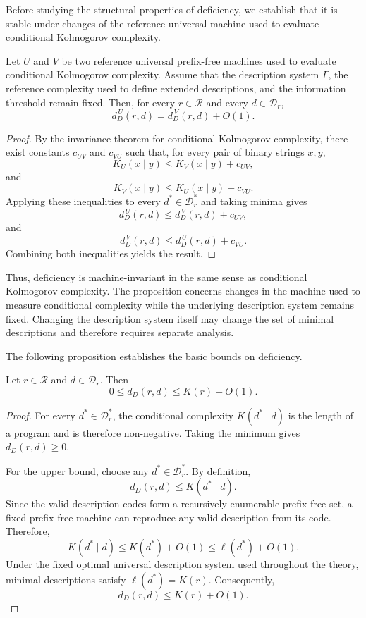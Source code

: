 Before studying the structural properties of deficiency, we establish that it is stable under changes of the reference universal machine used to evaluate conditional Kolmogorov complexity.

\begin{proposition}
\label{prop:deficiency_description_machine_invariance}
Let $U$ and $V$ be two reference universal prefix-free machines used to evaluate conditional Kolmogorov complexity. Assume that the description system $\Gamma$, the reference complexity used to define extended descriptions, and the information threshold remain fixed. Then, for every $r\in\mathcal R$ and every $d\in\mathcal D_r$,
\[
d_D^{\,U}(r,d) = d_D^{\,V}(r,d)+O(1).
\]
\end{proposition}
\begin{proof}
By the invariance theorem for conditional Kolmogorov complexity, there exist constants $c_{UV}$ and $c_{VU}$ such that, for every pair of binary strings $x,y$,
\[
K_U(x\mid y)\le K_V(x\mid y)+c_{UV},
\]
and
\[
K_V(x\mid y)\le K_U(x\mid y)+c_{VU}.
\]
Applying these inequalities to every $d^\ast\in\mathcal D_r^\ast$ and taking minima gives
\[
d_D^{\,U}(r,d)\le d_D^{\,V}(r,d)+c_{UV},
\]
and
\[
d_D^{\,V}(r,d)\le d_D^{\,U}(r,d)+c_{VU}.
\]
Combining both inequalities yields the result.
\end{proof}

Thus, deficiency is machine-invariant in the same sense as conditional Kolmogorov complexity. The proposition concerns changes in the machine used to measure conditional complexity while the underlying description system remains fixed. Changing the description system itself may change the set of minimal descriptions and therefore requires separate analysis.

The following proposition establishes the basic bounds on deficiency.

\begin{proposition}
\label{prop:deficiency_description_bounds}
Let $r\in\mathcal R$ and $d\in\mathcal D_r$. Then
\[
0\le d_D(r,d)\le K(r)+O(1).
\]
\end{proposition}
\begin{proof}
For every $d^\ast\in\mathcal D_r^\ast$, the conditional complexity $K(d^\ast\mid d)$ is the length of a program and is therefore non-negative. Taking the minimum gives $d_D(r,d)\ge 0$.

For the upper bound, choose any $d^\ast\in\mathcal D_r^\ast$. By definition,
\[
d_D(r,d)\le K(d^\ast\mid d).
\]
Since the valid description codes form a recursively enumerable prefix-free set, a fixed prefix-free machine can reproduce any valid description from its code. Therefore,
\[
K(d^\ast\mid d)\le K(d^\ast)+O(1) \le \ell(d^\ast)+O(1).
\]
Under the fixed optimal universal description system used throughout the theory, minimal descriptions satisfy $\ell(d^\ast)=K(r)$. Consequently,
\[
d_D(r,d)\le K(r)+O(1).
\]
\end{proof}

